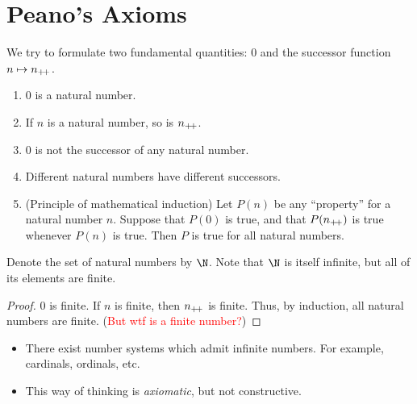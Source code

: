 \section{Peano's Axioms} \label{sec:peano}
We try to formulate two fundamental quantities: $0$ and the successor function
$n \mapsto n_{+\!+}$.
\begin{enumerate}[label=(P\arabic*)]
    \item $0$ is a natural number.
    \item If $n$ is a natural number, so is $n_{+\!+}$.
    \item $0$ is not the successor of any natural number.
    \item Different natural numbers have different successors.
    \item (Principle of mathematical induction) Let $P(n)$ be any ``property''
    for a natural number $n$.
    Suppose that $P(0)$ is true, and that $P(n_{+\!+})$ is true whenever $P(n)$ is
    true.
    Then $P$ is true for all natural numbers.
\end{enumerate}
Denote the set of natural numbers by $\N$.
Note that $\N$ is itself infinite, but all of its elements are finite.
\begin{proof}
    $0$ is finite.
    If $n$ is finite, then $n_{+\!+}$ is finite.
    Thus, by induction, all natural numbers are finite.
    (\textcolor{Red}{But wtf is a finite number?})
\end{proof}
\begin{remark} \leavevmode
    \begin{itemize}
        \item There exist number systems which admit infinite numbers.
        For example, cardinals, ordinals, etc.
        \item This way of thinking is \textit{axiomatic}, but not constructive.
    \end{itemize}
\end{remark}
